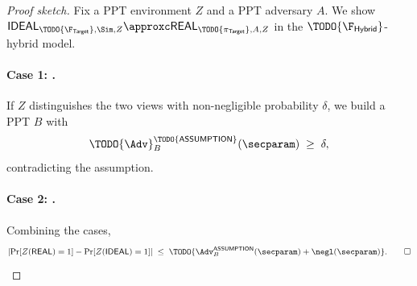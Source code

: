 \begin{proof}[Proof sketch]
Fix a PPT environment $Z$ and a PPT adversary $A$. We show
$\textsf{IDEAL}_{\TODO{\F_\textsf{Target}}, \Sim, Z}
\approxc
\textsf{REAL}_{\TODO{\pi_\textsf{Target}}, A, Z}$
in the $\TODO{\F_\textsf{Hybrid}}$-hybrid model.

\paragraph{Case 1: .}
If $Z$ distinguishes the two views with non-negligible probability $\delta$,
we build a PPT  $B$ with
\[
  \TODO{\Adv}^{\TODO{\textsf{ASSUMPTION}}}_{B}(\secparam) \;\geq\; \delta,
\]
contradicting the assumption.

\paragraph{Case 2: .}

Combining the cases,
\[
  \left| \Pr[Z(\textsf{REAL}) = 1] - \Pr[Z(\textsf{IDEAL}) = 1] \right|
  \;\leq\; \TODO{\Adv^{\textsf{ASSUMPTION}}_{B}(\secparam) + \negl(\secparam)}.
  \qed
\]
\end{proof}

%
%
